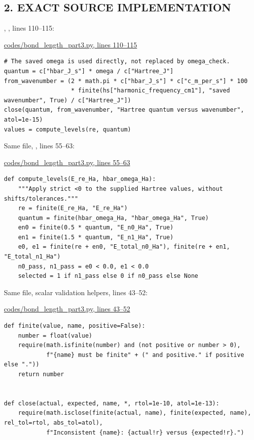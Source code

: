\documentclass[10pt,a4paper]{article}
\begin{document}
\subsection{2. EXACT SOURCE IMPLEMENTATION}
, , lines 110–115:

\href{/Users/novaz/Desktop/qml2.0/codes/bond\_length\_part3.py:110}{codes/bond\_length\_part3.py, lines 110–115}

\begin{Verbatim}
# The saved omega is used directly, not replaced by omega_check.
quantum = c["hbar_J_s"] * omega / c["Hartree_J"]
from_wavenumber = (2 * math.pi * c["hbar_J_s"] * c["c_m_per_s"] * 100
                   * finite(hs["harmonic_frequency_cm1"], "saved wavenumber", True) / c["Hartree_J"])
close(quantum, from_wavenumber, "Hartree quantum versus wavenumber", atol=1e-15)
values = compute_levels(re, quantum)
\end{Verbatim}
Same file, , lines 55–63:

\href{/Users/novaz/Desktop/qml2.0/codes/bond\_length\_part3.py:55}{codes/bond\_length\_part3.py, lines 55–63}

\begin{Verbatim}
def compute_levels(E_re_Ha, hbar_omega_Ha):
    """Apply strict <0 to the supplied Hartree values, without shifts/tolerances."""
    re = finite(E_re_Ha, "E_re_Ha")
    quantum = finite(hbar_omega_Ha, "hbar_omega_Ha", True)
    en0 = finite(0.5 * quantum, "E_n0_Ha", True)
    en1 = finite(1.5 * quantum, "E_n1_Ha", True)
    e0, e1 = finite(re + en0, "E_total_n0_Ha"), finite(re + en1, "E_total_n1_Ha")
    n0_pass, n1_pass = e0 < 0.0, e1 < 0.0
    selected = 1 if n1_pass else 0 if n0_pass else None
\end{Verbatim}
Same file, scalar validation helpers, lines 43–52:

\href{/Users/novaz/Desktop/qml2.0/codes/bond\_length\_part3.py:43}{codes/bond\_length\_part3.py, lines 43–52}

\begin{Verbatim}
def finite(value, name, positive=False):
    number = float(value)
    require(math.isfinite(number) and (not positive or number > 0),
            f"{name} must be finite" + (" and positive." if positive else "."))
    return number


def close(actual, expected, name, *, rtol=1e-10, atol=1e-13):
    require(math.isclose(finite(actual, name), finite(expected, name), rel_tol=rtol, abs_tol=atol),
            f"Inconsistent {name}: {actual!r} versus {expected!r}.")
\end{Verbatim}
\end{document}

